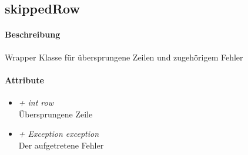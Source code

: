 \subsection{skippedRow}

\paragraph{Beschreibung}
Wrapper Klasse für übersprungene Zeilen und zugehörigem Fehler


\paragraph{Attribute}

\begin{itemize}
	
\item \textit{ + int row} \\ Übersprungene Zeile

\item \textit{ + Exception exception} \\ Der aufgetretene Fehler

\end{itemize}

